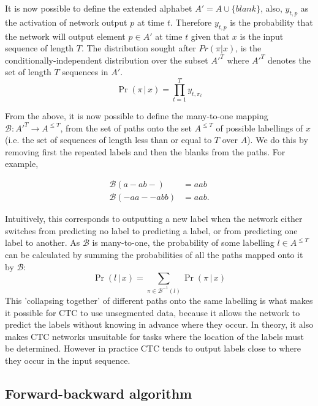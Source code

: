 It is now possible to define the extended alphabet $A' = A \cup \{blank\}$, also, $y_{t,p}$ as the activation of network output $p$ at time $t$.  Therefore $y_{t,p}$  is the probability that the network will output element $p \in A'$ at time $t$ given that $x$ is the input sequence of length $T$.  The distribution sought after $Pr(\pi|x)$, is the conditionally-independent distribution over the subset $A'^T$ where $A'^T$ denotes the set of length $T$ sequences in $A'$. 
\begin{equation}
\Pr( \pi \, | \, x ) = \prod_{t=1}^{T} y_{t,\pi_t}
\label{eqn_c3_ctc01}\end{equation}

From the above, it is now possible to define the many-to-one mapping $\mathcal{B} : A'^T \rightarrow A^{\le T}$, from the set of paths onto the set $A^{\le T}$ of possible labellings of $x$ (i.e. the set of sequences of length less than or equal to $T$ over $A$). We do this by removing first the repeated labels and then the blanks from the paths. For example,

\begin{equation}\begin{aligned}\mathcal{B}(a - ab-) &= aab \\ \mathcal{B}(-aa - -abb) &= aab.\end{aligned} \label{eqn_c3_ctc02}
\end{equation}

Intuitively, this corresponds to outputting a new label when the network either switches from predicting no label to predicting a label, or from predicting one label to another. As $\mathcal{B}$ is many-to-one, the probability of some labelling $l \in A^{\le T}$ can be calculated by summing the probabilities of all the paths mapped onto it by $\mathcal{B}$:
\begin{equation}
\Pr( l \, | \, x) = \sum_{\pi \in \mathcal{B}^{-1}(l)} \Pr( \pi \, | \, x)
\label{eqn_c3_ct03}\end{equation}
This 'collapsing together' of different paths onto the same labelling is what makes it possible for CTC to use unsegmented data, because it allows the network to predict the labels without knowing in advance where they occur. In theory, it also makes CTC networks unsuitable for tasks where the location of the labels must be determined. However in practice CTC tends to output labels close to where they occur in the input sequence.

\subsection{Forward-backward algorithm}

